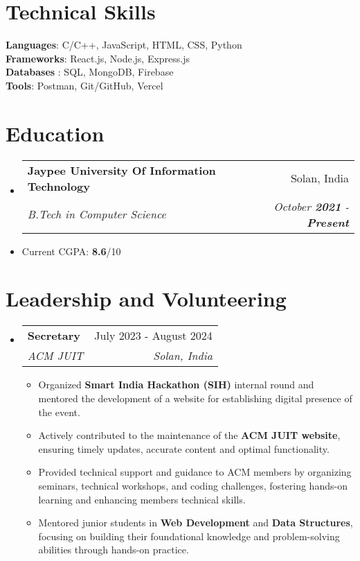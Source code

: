 \documentclass[letterpaper,11pt]{article}
\makeatletter
\newcommand{\resumeItem}[1]{
  \item\small{
    {#1 \vspace{-2pt}}
  }
}
\newcommand{\resumeSubheading}[4]{
  \vspace{-2pt}\item
    \begin{tabular*}{0.97\textwidth}[t]{l@{\extracolsep{\fill}}r}
      \textbf{#1} & #2 \\
      \textit{\small#3} & \textit{\small #4} \\
    \end{tabular*}\vspace{-7pt}
}
\newcommand{\resumeSubHeadingListStart}{\begin{itemize}[leftmargin=0.15in, label={}]}
\newcommand{\resumeSubHeadingListEnd}{\end{itemize}}
\newcommand{\resumeItemListStart}{\begin{itemize}}
\newcommand{\resumeItemListEnd}{\end{itemize}\vspace{-5pt}}
\makeatother
\begin{document}
%
\section{Technical Skills}
 \begin{itemize}[leftmargin=0.15in, label={}]
    \small{\item{
     \textbf{Languages}{: C/C++, JavaScript, HTML, CSS, Python} \\
     \textbf{Frameworks}{: React.js, Node.js, Express.js} \\
     \textbf{Databases} {: SQL, MongoDB, Firebase} \\
     \textbf{Tools}: Postman, Git/GitHub, Vercel }}
 \end{itemize}


\section{Education}
  \resumeSubHeadingListStart
    \resumeSubheading
      {Jaypee University Of Information Technology}{Solan, India}
      {B.Tech in Computer Science}{October \textbf{2021} - \textbf{Present}}
      \resumeItem{Current CGPA: \textbf{8.6}/10}
  \resumeSubHeadingListEnd

\section{Leadership and Volunteering}

  \resumeSubHeadingListStart
    \resumeSubheading
      {Secretary}{July 2023 - August 2024}
      {ACM JUIT}{Solan, India}
      \resumeItemListStart
        \resumeItem {Organized \textbf{Smart India Hackathon (SIH)} internal round and mentored the development of a website for establishing digital presence of the event.}
        \resumeItem{Actively contributed to the maintenance of the \textbf{ACM JUIT website}, ensuring timely updates, accurate content and optimal functionality.}
        \resumeItem{Provided technical support and guidance to ACM members by organizing seminars, technical workshops, and coding challenges, fostering hands-on learning and enhancing members technical skills.}
        \resumeItem{Mentored junior students in \textbf{Web Development} and \textbf{Data Structures}, focusing on building their foundational knowledge and problem-solving abilities through hands-on practice.}

      \resumeItemListEnd
    \resumeSubHeadingListEnd

\end{document}
